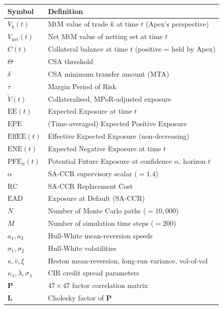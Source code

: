 \documentclass[11pt,a4paper]{article}
\begin{document}
\begin{longtable}{@{}ll@{}}
\toprule
\textbf{Symbol} & \textbf{Definition} \\
\midrule
\endhead
\bottomrule
\endfoot
$V_k(t)$          & MtM value of trade $k$ at time $t$ (Apex's perspective) \\
$V_{\text{net}}(t)$ & Net MtM value of netting set at time $t$ \\
$C(t)$            & Collateral balance at time $t$ (positive = held by Apex) \\
$\Theta$          & CSA threshold \\
$\delta$          & CSA minimum transfer amount (MTA) \\
$\tau$            & Margin Period of Risk \\
$\tilde{V}(t)$    & Collateralised, MPoR-adjusted exposure \\
$\text{EE}(t)$    & Expected Exposure at time $t$ \\
$\text{EPE}$      & (Time-averaged) Expected Positive Exposure \\
$\text{EffEE}(t)$ & Effective Expected Exposure (non-decreasing) \\
$\text{ENE}(t)$   & Expected Negative Exposure at time $t$ \\
$\text{PFE}_\alpha(t)$ & Potential Future Exposure at confidence $\alpha$, horizon $t$ \\
$\alpha$          & SA-CCR supervisory scalar ($= 1.4$) \\
$\text{RC}$       & SA-CCR Replacement Cost \\
$\text{EAD}$      & Exposure at Default (SA-CCR) \\
$N$               & Number of Monte Carlo paths ($= 10{,}000$) \\
$M$               & Number of simulation time steps ($= 200$) \\
$a_1, a_2$        & Hull-White mean-reversion speeds \\
$\sigma_1, \sigma_2$ & Hull-White volatilities \\
$\kappa, \bar{v}, \xi$ & Heston mean-reversion, long-run variance, vol-of-vol \\
$\kappa_\lambda, \bar{\lambda}, \sigma_\lambda$ & CIR credit spread parameters \\
$\mathbf{P}$      & $47 \times 47$ factor correlation matrix \\
$\mathbf{L}$      & Cholesky factor of $\mathbf{P}$ \\
\end{longtable}

\end{document}
